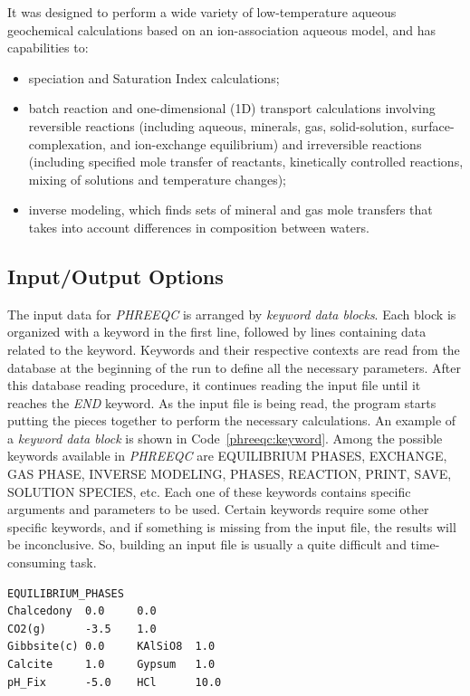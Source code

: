 It was designed to perform a wide variety of low-temperature aqueous geochemical calculations based on an ion-association aqueous model, and has capabilities to:
\begin{itemize}
\item speciation and Saturation Index calculations;
\item batch reaction and one-dimensional (1D) transport calculations involving reversible reactions (including aqueous, minerals, gas, solid-solution, surface-complexation, and ion-exchange equilibrium) and irreversible reactions (including specified mole transfer of reactants, kinetically controlled reactions, mixing of solutions and temperature changes);
\item inverse modeling, which finds sets of mineral and gas mole transfers that takes into account differences in composition between waters.
\end{itemize}

\subsection{Input/Output Options}
The input data for \emph{PHREEQC} is arranged by \emph{keyword data blocks}. Each block is organized with a keyword in the first line, followed by lines containing data related to the keyword. Keywords and their respective contexts are read from the database at the beginning of the run to define all the necessary parameters. After this database reading procedure, it continues reading the input file until it reaches the \emph{END} keyword. As the input file is being read, the program starts putting the pieces together to perform the necessary calculations. An example of a \emph{keyword data block} is shown in Code~\ref{phreeqc:keyword}. Among the possible keywords available in \emph{PHREEQC} are EQUILIBRIUM PHASES, EXCHANGE, GAS PHASE, INVERSE MODELING, PHASES, REACTION, PRINT, SAVE, SOLUTION SPECIES, etc. Each one of these keywords contains specific arguments and parameters to be used. Certain keywords require some other specific keywords, and if something is missing from the input file, the results will be inconclusive. So, building an input file is usually a quite difficult and time-consuming task. 

\begin{minipage}[c]{0.92\textwidth}
\begin{lstlisting}[frame=single, caption=\emph{PHREEQC} keyword data block example, label=phreeqc:keyword]
EQUILIBRIUM_PHASES
Chalcedony  0.0     0.0
CO2(g)      -3.5    1.0
Gibbsite(c) 0.0     KAlSiO8  1.0
Calcite     1.0     Gypsum   1.0
pH_Fix      -5.0    HCl      10.0
\end{lstlisting}
\end{minipage}

